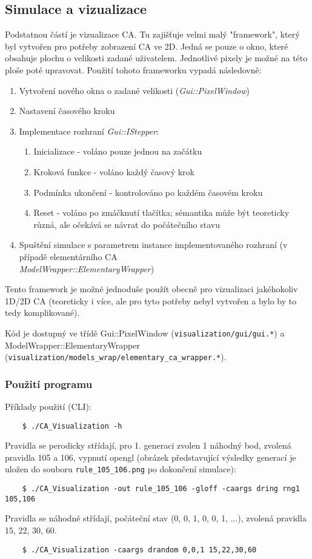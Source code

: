\subsection{Simulace a vizualizace}
Podstatnou částí je vizualizace CA. Tu zajišťuje velmi malý "framework",
který byl vytvořen pro potřeby zobrazení CA ve 2D.
Jedná se pouze o okno, které obsahuje plochu o velikosti zadané uživatelem.
Jednotlivé pixely je možné na této ploše poté upravovat.
Použití tohoto frameworku vypadá následovně:
\begin{enumerate}
	\item Vytvoření nového okna o zadané velikosti (\textit{Gui::PixelWindow})
	\item Nastavení časového kroku
	\item Implementace rozhraní \textit{Gui::IStepper}:
	\begin{enumerate}
		\item Inicializace - voláno pouze jednou na začátku
		\item Kroková funkce - voláno každý časový krok
		\item Podmínka ukončení - kontrolováno po každém časovém kroku
		\item Reset - voláno po zmáčknutí tlačítka; sémantika může
		být teoreticky různá, ale očekává se návrat do počátečního stavu
	\end{enumerate}
	\item Spuštění simulace s parametrem instance implementovaného rozhraní
	(v případě elementárního CA \\\textit{ModelWrapper::ElementaryWrapper})
\end{enumerate}
Tento framework je možné jednoduše použít obecně pro vizualizaci jakéhokoliv 1D/2D CA
(teoreticky i více, ale pro tyto potřeby nebyl vytvořen a bylo by to tedy komplikované).

Kód je dostupný ve třídě Gui::PixelWindow (\verb|visualization/gui/gui.*|)
a ModelWrapper::ElementaryWrapper (\verb|visualization/models_wrap/elementary_ca_wrapper.*|).

\subsubsection{Použití programu}

Příklady použití (CLI):
\begin{verbatim}
	$ ./CA_Visualization -h
\end{verbatim}

Pravidla se perodicky střídají, pro 1.
generaci zvolen 1 náhodný bod,
zvolená pravidla 105 a 106,
vypnutí opengl (obrázek představující výsledky generací je
uložen do souboru \verb|rule_105_106.png| po dokončení simulace):
\begin{verbatim}
	$ ./CA_Visualization -out rule_105_106 -gloff -caargs dring rng1 105,106
\end{verbatim}

Pravidla se náhodně střídají, počáteční stav (0, 0, 1, 0, 0, 1, ...),
zvolená pravidla 15, 22, 30, 60.
\begin{verbatim}
	$ ./CA_Visualization -caargs drandom 0,0,1 15,22,30,60
\end{verbatim}

